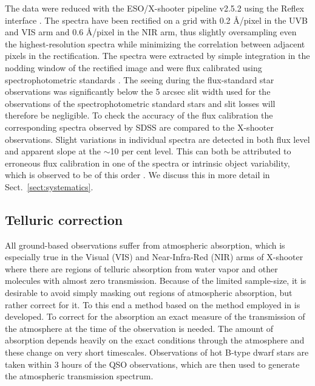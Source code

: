 \documentclass{aa}    %
\newcommand{\sectionname}{Sect.}
\newcommand{\Sect}[1]{\sectionname~\ref{sect:#1}}
\newcommand{\sect}[1]{\Sect{#1}}
\newcommand{\sectlabel}[1]{\label{sect:#1}}
\begin{document}
The data were reduced with the ESO/X-shooter pipeline v2.5.2
\citep{Modigliani2010} using the Reflex interface \citep{Freudling2013}. The
spectra have been rectified on a grid with 0.2 \AA/pixel in the UVB and VIS arm
and 0.6 \AA/pixel in the NIR arm, thus slightly oversampling even the
highest-resolution spectra while minimizing the correlation between adjacent
pixels in the rectification. The spectra were extracted by simple integration in
the nodding window of the rectified image and were flux calibrated using
spectrophotometric standards \citep{Vernet2010, Hamuy1994}. The seeing during the
flux-standard star observations was significantly below the 5 arcsec slit width
used for the observations of the spectrophotometric standard stars and slit
losses will therefore be negligible. To check the accuracy of the flux
calibration the corresponding spectra observed by SDSS \citep{Ahn2014} are
compared to the X-shooter observations. Slight variations in individual spectra
are detected in both flux level and apparent slope at the $\sim$10 per cent
level. This can both be attributed to erroneous flux calibration in one of the
spectra or intrinsic object variability, which is observed to be of this order
\citep{MacLeod2012, Morganson2014}. We discuss this in more detail in
\sect{systematics}.






\subsection{Telluric correction}   \sectlabel{telluric}

All ground-based observations suffer from atmospheric absorption, which
is especially true in the Visual (VIS) and Near-Infra-Red (NIR) arms
of X-shooter where there are regions of telluric absorption from water
vapor and other molecules with almost zero transmission. Because of
the limited sample-size, it is desirable to avoid simply masking out
regions of atmospheric absorption, but rather correct for it. To this
end a method based on the method employed in \citet{Chen2014} is
developed.  To correct for the absorption an exact measure of the
transmission of the atmosphere at the time of the observation is
needed. The amount of absorption depends heavily on the exact
conditions through the atmosphere and these change on very short
timescales. Observations of hot B-type dwarf stars are taken within 3
hours of the QSO observations, which are then used to
generate the atmospheric transmission spectrum.
\end{document}
